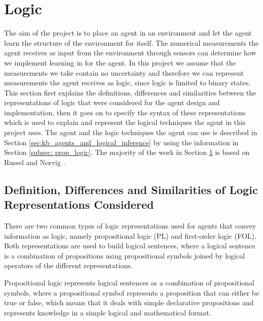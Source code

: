 

\section{Logic}
\label{sec:logic}

The aim of the project is to place an agent in an environment and let the agent learn the structure of the environment for itself. The numerical measurements the agent receives as input from the environment through sensors can determine how we implement learning in for the agent. In this project we assume that the measurements we take contain no uncertainty and therefore we can represent measurements the agent receives as logic, since logic is limited to binary states.  This section first explains the definitions, differences and similarities between the representations of logic that were considered for the agent design and implementation, then it goes on to specify the syntax of these representations which is used to explain and represent the logical techniques the agent in this project uses. The agent and the logic techniques the agent can use is described in Section \ref{sec:kb_agents_and_logical_inference} by using the information in Section \ref{subsec: prop_logic}. The majority of the work in Section \ref{sec:logic} is based on Russel and Norvig \cite{russell2016artificial}.   


\subsection{Definition, Differences and Similarities of Logic Representations Considered}
\label{subsec: diff_sim_logic_reps}

There are two common types of logic representations used for agents that convey information as logic, namely propositional logic (PL) and first-order logic (FOL). 
Both representations are used to build logical sentences, where a logical sentence is a combination of propositions using propositional symbols joined by logical operators of the different representations. 

Propositional logic represents logical sentences as a combination of propositional symbols, where a propositional symbol represents a proposition that can either be true or false, which means that it deals with simple declarative propositions and represents knowledge in a simple logical and mathematical format. 

